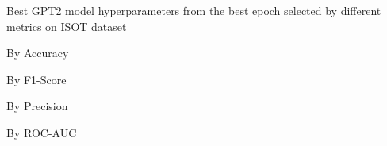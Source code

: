 \begin{table}[!htbp]
    \caption{Best GPT2 model hyperparameters from the best epoch selected by different metrics on ISOT dataset}
    \label{tab:isot_gpt2_hparams}
    \centering

    \begin{subtable}[t]{0.48\linewidth}
        \scriptsize
        \caption{By Accuracy}
        
    \end{subtable}
    \hfill
    \begin{subtable}[t]{0.48\linewidth}
        \scriptsize
        \caption{By F1-Score}
        
    \end{subtable}

    \vspace{1em}

    \begin{subtable}[t]{0.48\linewidth}
        \scriptsize
        \caption{By Precision}
        
    \end{subtable}
    \hfill
    \begin{subtable}[t]{0.48\linewidth}
        \scriptsize
        \caption{By ROC-AUC}
        
    \end{subtable}


\end{table}